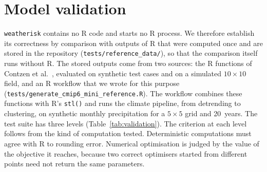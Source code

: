 \documentclass[preprint,12pt,a4paper]{elsarticle}
\newcommand{\rev}[1]{{#1}}
\begin{document}
\FloatBarrier


\rev{\section{Model validation}
\label{sec:validation}}


\rev{\texttt{weatherisk} contains no R code and starts no R process.
We therefore establish its correctness by comparison with outputs of
R that were computed once and are stored in the repository
(\texttt{tests/reference\_data/}), so that the comparison itself runs
without R. The stored outputs come from two sources: the R functions
of Contzen et al.~\cite{contzen2025}, evaluated on synthetic test
cases and on a simulated $10{\times}10$ field, and an R workflow that
we wrote for this purpose
(\texttt{tests/generate\_cmip6\_mini\_reference.R}). The workflow
combines these functions with R's \texttt{stl()} and runs the climate
pipeline, from detrending to clustering, on synthetic monthly
precipitation for a $5{\times}5$ grid and 20~years. The test suite has three levels
(Table~\ref{tab:validation}). The criterion at each level follows from
the kind of computation tested. Deterministic computations must agree
with R to rounding error. Numerical optimisation is judged by the
value of the objective it reaches, because two correct optimisers
started from different points need not return the same parameters.

}
\end{document}
